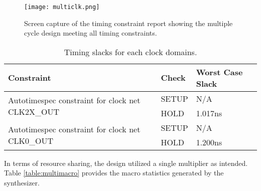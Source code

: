 \documentclass[paper=usletter, fontsize=12pt]{article}
\begin{document}
        \begin{figure}[ht]
            \begin{center}
                \texttt{[image: multiclk.png]}
                \caption{Screen capture of the timing constraint report showing
                the multiple cycle design meeting all timing constraints.}
                \label{fig:multiclk}
            \end{center}
        \end{figure}

        \begin{table}[h]
            \caption{Timing slacks for each clock domains.}
            \label{table:singslacks}
            \centering
            \begin{tabular}{ lm{5em}m{10em} }
\hline
\textbf{Constraint} & \textbf{Check}  &   \textbf{Worst Case Slack} \\
\hline
\multirow{ 2}{*}{Autotimespec constraint for clock net CLK2X\_OUT} & SETUP &
N/A \\
 & HOLD & 1.017ns \\
\multirow{ 2}{*}{Autotimespec constraint for clock net CLK0\_OUT} & SETUP &
N/A \\
 & HOLD & 1.200ns \\

\hline
            \end{tabular}
        \end{table}

        In terms of resource sharing, the design utilized a single multiplier
        as intended. Table \ref{table:multimacro} provides the macro statistics
        generated by the synthesizer.
\end{document}
